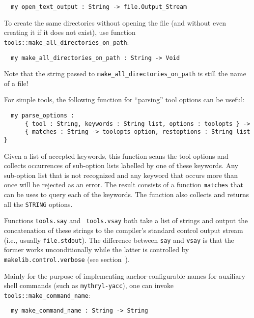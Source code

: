 \begin{verbatim}
  my open_text_output : String -> file.Output_Stream
\end{verbatim}

To create the same directories without opening the file (and without
even creating it if it does not exist), use function {\tt
tools::make_all_directories_on_path}:

\begin{verbatim}
  my make_all_directories_on_path : String -> Void
\end{verbatim}

Note that the string passed to {\tt make_all_directories_on_path}
is still the name of a file!

  For simple tools, the following
function for ``parsing'' tool options can be useful:

\begin{verbatim}
  my parse_options :
      { tool : String, keywords : String list, options : toolopts } ->
      { matches : String -> toolopts option, restoptions : String list }
\end{verbatim}

Given a list of accepted keywords, this function scans the tool
options and collects occurrences of sub-option lists labelled by one
of these keywords.  Any sub-option list that is not recognized and any
keyword that occurs more than once will be rejected as an error.  The
result consists of a function {\tt matches} that can be uses to query
each of the keywords.  The function also collects and returns all the
{\tt STRING} options.

 Functions {\tt tools.say} and {\tt
tools.vsay} both take a list of strings and output the concatenation
of these strings to the compiler's standard control output stream
(i.e., usually {\tt file.stdout}).  The difference between {\tt say}
and {\tt vsay} is that the former works unconditionally while the
latter is controlled by {\tt makelib.control.verbose} (see
section~).

 Mainly for the purpose of
implementing anchor-configurable names for auxiliary shell commands
(such as {\tt mythryl-yacc}), one can invoke {\tt tools::make_command_name}:

\begin{verbatim}
  my make_command_name : String -> String
\end{verbatim}

